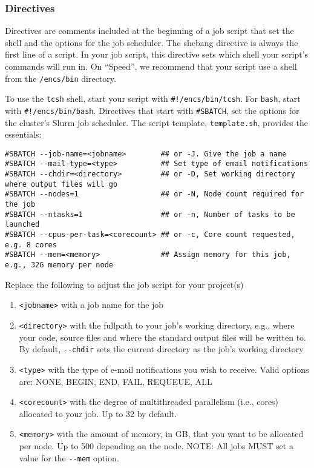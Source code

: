 \subsubsection{Directives}
\label{sect:directives}

Directives are comments included at the beginning of a job script that set the shell 
and the options for the job scheduler. 
%
The shebang directive is always the first line of a script. In your job script, 
this directive sets which shell your script's commands will run in. On ``Speed'', 
we recommend that your script use a shell from the \texttt{/encs/bin} directory. 

To use the \texttt{tcsh} shell, start your script with \verb|#!/encs/bin/tcsh|.
%
For \texttt{bash}, start with \verb|#!/encs/bin/bash|.
%
Directives that start with \verb|#SBATCH|, set the options for the cluster's 
Slurm job scheduler. The script template, \texttt{template.sh}, 
provides the essentials:

\begin{verbatim}
#SBATCH --job-name=<jobname>        ## or -J. Give the job a name 
#SBATCH --mail-type=<type>          ## Set type of email notifications
#SBATCH --chdir=<directory>         ## or -D, Set working directory where output files will go 
#SBATCH --nodes=1                   ## or -N, Node count required for the job
#SBATCH --ntasks=1                  ## or -n, Number of tasks to be launched
#SBATCH --cpus-per-task=<corecount> ## or -c, Core count requested, e.g. 8 cores
#SBATCH --mem=<memory>              ## Assign memory for this job, e.g., 32G memory per node 
\end{verbatim}

Replace the following to adjust the job script for your project(s)
\begin{enumerate}
  \item \verb+<jobname>+ with a job name for the job
  \item \verb+<directory>+ with the fullpath to your job's working directory, e.g., where your code,
source files and where the standard output files will be written to. By default, \verb+--chdir+
sets the current directory as the job's working directory 
  \item \verb+<type>+ with the type of e-mail notifications you wish to receive. Valid options are: NONE, BEGIN, END, FAIL, REQUEUE, ALL 
  \item \verb+<corecount>+ with the degree of multithreaded parallelism (i.e., cores) allocated to your job. Up to 32 by default.
  \item \verb+<memory>+ with the amount of memory, in GB, that you want to be allocated per node. Up to 500 depending on the node. 
  NOTE: All jobs MUST set a value for the \verb|--mem| option.
\end{enumerate}


